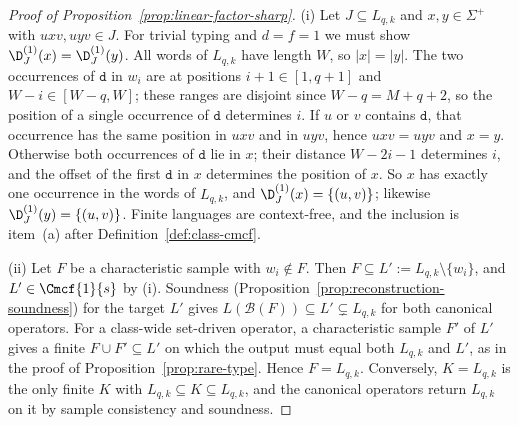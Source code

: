 \begin{proof}[Proof of Proposition~\ref{prop:linear-factor-sharp}]
(i) Let $J\subseteq L_{q,k}$ and $x,y\in\Sigma^+$ with $uxv,uyv\in J$.  For
trivial typing and $d=f=1$ we must show $\D_J^{(1)}(x)=\D_J^{(1)}(y)$.  All
words of $L_{q,k}$ have length $W$, so $|x|=|y|$.  The two occurrences of
$\mathtt d$ in $w_i$ are at positions $i+1\in[1,q+1]$ and
$W-i\in[W-q,W]$; these ranges are disjoint since $W-q=M+q+2$, so the
position of a single occurrence of $\mathtt d$ determines $i$.  If $u$ or $v$
contains $\mathtt d$, that occurrence has the same position in $uxv$ and in
$uyv$, hence $uxv=uyv$ and $x=y$.  Otherwise both occurrences of
$\mathtt d$ lie in $x$; their distance $W-2i-1$ determines $i$, and the
offset of the first $\mathtt d$ in $x$ determines the position of $x$.  So
$x$ has exactly one occurrence in the words of $L_{q,k}$, and
$\D_J^{(1)}(x)=\{(u,v)\}$; likewise $\D_J^{(1)}(y)=\{(u,v)\}$.  Finite
languages are context-free, and the inclusion is item~(a) after
Definition~\ref{def:class-cmcf}.

(ii) Let $F$ be a characteristic sample with $w_i\notin F$.  Then
$F\subseteq L':=L_{q,k}\setminus\{w_i\}$, and $L'\in\Cmcf{1}{s}$ by (i).
Soundness (Proposition~\ref{prop:reconstruction-soundness}) for the target
$L'$ gives $L(\mathcal B(F))\subseteq L'\subsetneq L_{q,k}$ for both canonical
operators.  For a class-wide set-driven operator, a characteristic sample
$F'$ of $L'$ gives a finite $F\cup F'\subseteq L'$ on which the output must
equal both $L_{q,k}$ and $L'$, as in the proof of
Proposition~\ref{prop:rare-type}.  Hence $F=L_{q,k}$.  Conversely,
$K=L_{q,k}$ is the only finite $K$ with $L_{q,k}\subseteq K\subseteq L_{q,k}$,
and the canonical operators return $L_{q,k}$ on it by sample consistency and
soundness.


\end{proof}
